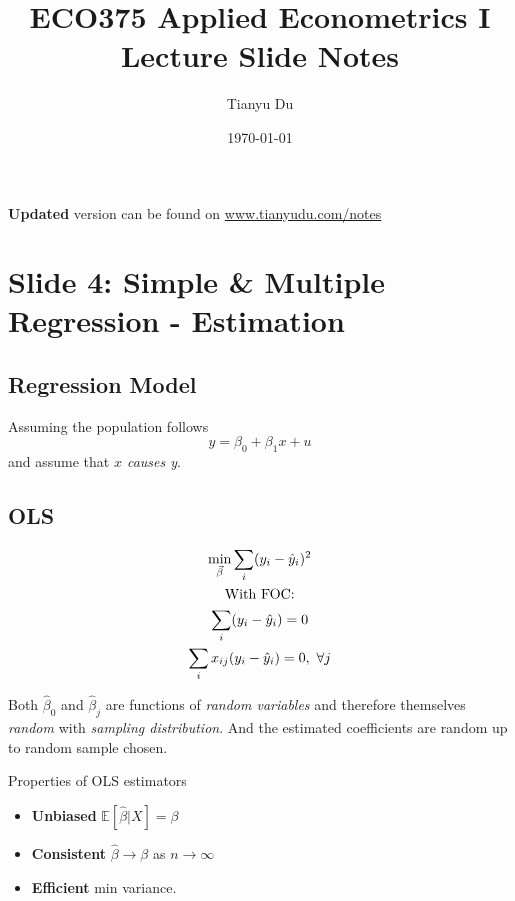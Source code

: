 \documentclass[]{article}
\title{ECO375 Applied Econometrics I \\ \small Lecture Slide Notes}
\author{Tianyu Du}
\date{\today}
\begin{document}
	\maketitle
	\doclicenseThis
	\textbf{Updated} version can be found on \url{www.tianyudu.com/notes}
	
	\tableofcontents
	
	\newpage
	
	\setcounter{section}{3}
	\section{Slide 4: Simple \& Multiple Regression - Estimation}
	\subsection{Regression Model}
	\begin{assumption}
	    Assuming the population follows
	    \[
	        y = \beta_0 + \beta_1 x + u
	    \]
	    and assume that \emph{$x$ causes y}.
	\end{assumption}
	
	\subsection{OLS}
	\begin{gather*}
	    \min_{\vec{\beta}} \sum_{i} (y_i - \hat{y}_i)^2 \\
	    \text{{With FOC:}} \\
	    \sum_{i}(y_i - \hat{y}_i) = 0 \\
	    \sum_{i}x_{ij}(y_i - \hat{y}_i) = 0,\ \forall j
	\end{gather*}
	
	\begin{remark}
	    Both $\hat{\beta}_0$ and $\hat{\beta}_j$ are functions of \emph{random variables} and therefore themselves \emph{random} with \emph{sampling distribution}. And the estimated coefficients are random up to random sample chosen.
	\end{remark}
	
	\begin{proposition}
	    Properties of OLS estimators
	    \begin{itemize}
	        \item \textbf{Unbiased} $\mathbb{E}[\hat{\beta} | X] = \beta$
	        \item \textbf{Consistent} $\hat{\beta} \to \beta$ as $n \to \infty$
	        \item \textbf{Efficient} min variance.
	    \end{itemize}
	\end{proposition}
	
\end{document}
